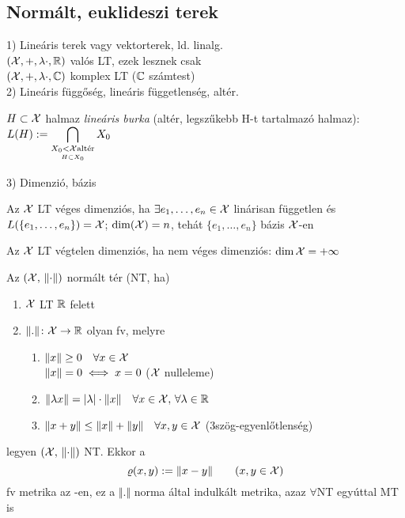 \subsection{Normált, euklideszi terek}
1) Lineáris terek vagy vektorterek, ld. linalg.\\
$(\mathcal{X}, +, \lambda\cdot,\mathbb{R})$ valós  LT, ezek lesznek csak\\
$(\mathcal{X}, +, \lambda\cdot,\mathbb{C})$ komplex LT ($\mathbb{C}$ számtest)\\
2) Lineáris függőség, lineáris függetlenség, altér.

\begin{de}
  $H \subset \mathcal{X}$ halmaz \emph{lineáris burka} (altér, legszűkebb H-t
  tartalmazó halmaz):
  $\displaystyle L(H) := \bigcap_{\underset{H\subset X_0}{X_0 < \mathcal{X} \text{altér}}} X_0$
\end{de}
3) Dimenzió, bázis

\begin{de}
  \begin{enumzjb}
  \item Az $\mathcal{X}$ LT véges dimenziós, ha $\exists  e_1,\ldots,e_n\in \mathcal{X}$
    linárisan független és $L(\{e_1,\ldots,e_n\})=\mathcal{X}$; $\dim(\mathcal{X}) = n$, tehát
    $\{e_1,\ldots,e_n\}$ bázis $\mathcal{X}$-en
  \item Az $\mathcal{X}$ LT végtelen dimenziós, ha nem véges dimenziós: $\dim\mathcal{X}
    = +\infty$
  \end{enumzjb}
\end{de}


\begin{de}
  Az $(\mathcal{X},\,\left\Vert \cdot\right\Vert)$ normált tér (NT, ha)
  \begin{enumerate}
  \item $\mathcal{X}$ LT $\mathbb{R}$ felett
  \item $\Vert.\Vert\colon \mathcal{X}\to\mathbb{R}$ olyan fv, melyre
    \begin{enumerate}
    \item $\Vert x \Vert \geq 0\quad \forall x\in\mathcal{X}$\\
      $\Vert x \Vert = 0 \iff x = 0$ ($\mathcal{X}$ nulleleme)
    \item $\Vert\lambda x\Vert = \vert\lambda\vert\cdot \Vert
      x\Vert\quad \forall x\in \mathcal{X},\,\forall \lambda\in\mathbb{R}$
    \item $\Vert x+y\Vert\leq\Vert x\Vert+\Vert y\Vert \quad
      \forall x,y\in \mathcal{X}$ (3szög-egyenlőtlenség)
    \end{enumerate}
  \end{enumerate}
\end{de}
\begin{te}
  legyen $(\mathcal{X},\,\left\Vert \cdot\right\Vert)$ NT. Ekkor a 
  \[\varrho(x,y) := \Vert x - y \Vert\qquad (x,y\in \mathcal{X})\]
  fv metrika az \X-en, ez a $\Vert.\Vert$ norma által indulkált
  metrika,
  azaz $\forall$NT egyúttal MT is
\end{te}

